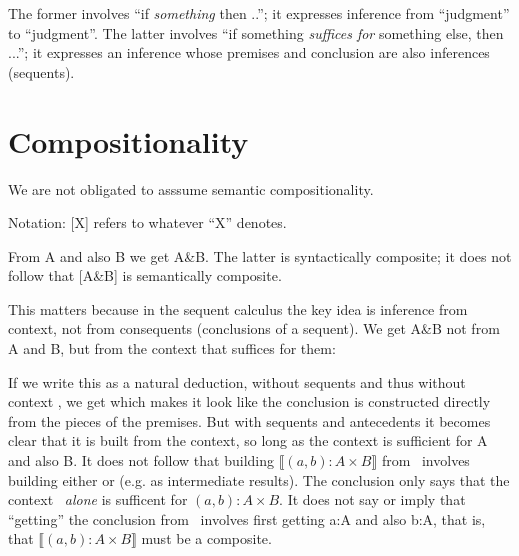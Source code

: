 \documentclass{article}
\begin{document}


The former involves ``if \textit{something} then ..''; it expresses
inference from ``judgment'' to ``judgment''. The latter involves ``if
something \textit{suffices for} something else, then ...''; it
expresses an inference whose premises and conclusion are also
inferences (sequents).

\section{Compositionality}

We are not obligated to asssume semantic compositionality.

Notation:  [X] refers to whatever ``X'' denotes.

From A and also B we get A\&B. The latter is syntactically composite;
it does not follow that [A\&B] is semantically composite.

This matters because in the sequent calculus the key idea is inference
from context, not from consequents (conclusions of a sequent). We get
A\&B not from A and B, but from the context that suffices for them:



If we write this as a natural deduction, without sequents and thus
without context \ContextG , we get
which
makes it look like the conclusion is constructed directly from the
pieces of the premises. But with sequents and antecedents it becomes
clear that it is built from the context, so long as the context is
sufficient for A and also B. It does not follow that building
\(\llbracket (a,b):A\times B\rrbracket\) from \ContextG\ involves
building either  or  (e.g. as intermediate
results). The conclusion only says that the context
\ContextG\ \textit{alone} is sufficent for \((a,b):A\times B\). It
does not say or imply that ``getting'' the conclusion from
\ContextG\ involves first getting a:A and also b:A, that is, that
\(\llbracket (a,b):A\times B\rrbracket\) must be a composite.
\end{document}
